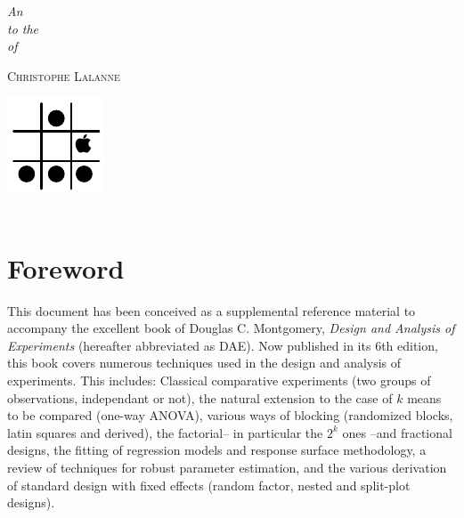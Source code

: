 \documentclass[11pt,a4paper]{memoir}\usepackage[]{graphicx}\usepackage[]{color}
\begin{document}
\frontmatter
\thispagestyle{empty}

\mbox{}\vspace{2in}
\noindent
\begin{flushright}
{\LARGE\itshape{}An}\\[2\baselineskip]
{\LARGE\itshape{}to the}\\[2\baselineskip]
{\LARGE\itshape{}of}
\end{flushright}

\vspace{6\baselineskip}
\hfill{\Large\scshape{}Christophe Lalanne}

\vfill
\begin{flushright}
  {\includegraphics[scale=.75]{logo}\\{\small \texttt{\GITAbrHash}}\\{\small %
    \texttt{\VCDateTEX}}}\par 
\vspace*{3\baselineskip}
\end{flushright}

\cleartorecto\tableofcontents*

\mainmatter



\section*{Foreword}


This document has been conceived as a supplemental reference material to
accompany the excellent book of Douglas C. Montgomery, \emph{Design and
Analysis of Experiments} (hereafter abbreviated as DAE). Now published in its
6th edition, this book covers numerous techniques used in the design and
analysis of experiments. This includes: Classical comparative experiments (two
groups of observations, independant or not), the natural extension to the case
of $k$ means to be compared (one-way ANOVA), various ways of blocking
(randomized blocks, latin squares and derived), the factorial-- in particular
the $2^k$ ones --and fractional designs, the fitting of regression models and
response surface methodology, a review of techniques for robust parameter
estimation, and the various derivation of standard design with fixed effects
(random factor, nested and split-plot designs).
\end{document}
